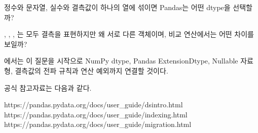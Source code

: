 정수와 문자열, 실수와 결측값이 하나의 열에 섞이면 Pandas는 어떤 dtype을 선택할까?

, , , 는 모두 결측을 표현하지만 왜 서로 다른 객체이며, 비교 연산에서는 어떤 차이를 보일까?

에서는 이 질문을 시작으로 NumPy dtype, Pandas ExtensionDtype, Nullable 자료형, 결측값의 전파 규칙과 연산 예외까지 연결할 것이다.

공식 참고자료는 다음과 같다.
\begin{dhksmry}
https://pandas.pydata.org/docs/user_guide/dsintro.html
https://pandas.pydata.org/docs/user_guide/indexing.html
https://pandas.pydata.org/docs/user_guide/migration.html
\end{dhksmry}